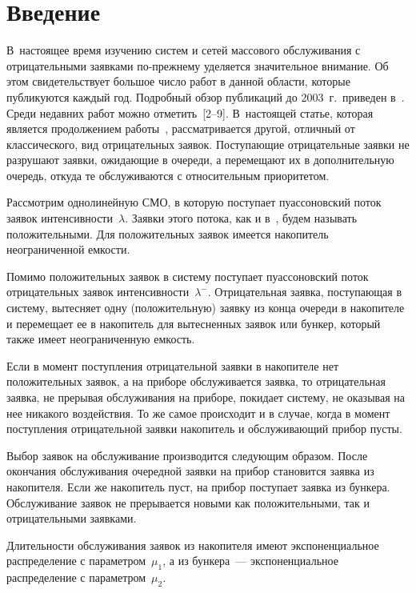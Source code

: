       \begin{multicols}{2}
      
            \label{st\stat}



\section{Введение}

В~настоящее время изучению систем и сетей массового обслуживания
с отрицательными заявками по-прежнему уделяется значительное внимание.
Об этом свидетельствует большое число работ в данной области, которые
публикуются каждый год. Подробный обзор публикаций до 2003~г.\
приведен в~\cite{bib0}.
Среди недавних работ можно отметить~[2--9].
В~настоящей статье, которая является продолжением работы~\cite{mandzo},
рассматривается другой, отличный от классического, вид отрицательных заявок.
Поступающие отрицательные
заявки не разрушают заявки, ожидающие в очереди, а перемещают
их в дополнительную очередь, откуда те
обслуживаются с относительным приоритетом.

Рассмотрим однолинейную СМО, в
которую поступает пуассоновский поток заявок интен\-сив\-ности~$\lambda$. 
Заявки этого потока, как и в~\cite{mandzo}, будем называть
положительными.
Для положительных заявок имеется накопитель неограниченной ем\-кости.

Помимо положительных заявок в
систему поступает пуассоновский поток отрицательных заявок
интенсивности~$\lambda^-$. Отрицательная заявка, поступающая в
систему, вытесняет одну (положительную) заявку из конца очереди в накопителе и
перемещает ее в накопитель для вытесненных заявок или бункер,
который также имеет неограниченную емкость.

Если в момент поступления отрицательной заявки в накопителе нет
положительных заявок, а на приборе обслуживается заявка, то
отрицательная заявка, не прерывая обслуживания на приборе,
покидает систему, не оказывая на нее никакого воздействия.
То же самое происходит и в случае, когда в момент поступления
отрицательной заявки накопитель и обслуживающий прибор пусты.

Выбор заявок на обслуживание производится следующим образом.
После окончания обслуживания очередной заявки на прибор
становится заявка из накопителя.
Если же накопитель пуст, на прибор поступает заявка из бункера.
Обслуживание заявок не прерывается новыми как положительными, так
и отрицательными заявками.

Длительности обслуживания заявок из накопителя имеют экспоненциальное
распределение с параметром~$\mu_1$, а из бункера~--- экспоненциальное
распределение с параметром~$\mu_2$.


\end{multicols}
